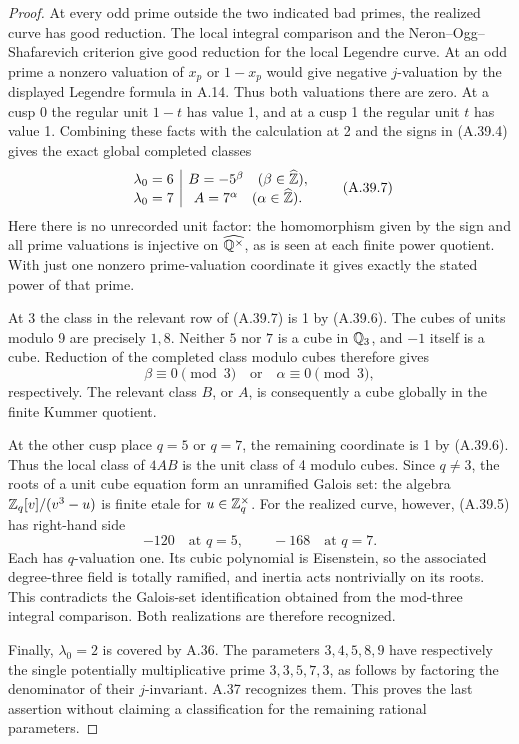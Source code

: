 \begin{proof}
At every odd prime outside the two indicated bad primes, the
realized curve has good reduction.  The local integral comparison
and the Neron--Ogg--Shafarevich criterion give good reduction for
the local Legendre curve.  At an odd prime a nonzero valuation of
$x_p$ or $1-x_p$ would give negative $j$-valuation by the displayed
Legendre formula in A.14.  Thus both valuations there are zero.
At a cusp 0 the regular unit $1-t$ has value 1, and at a cusp 1
the regular unit $t$ has value 1.  Combining these facts with the
calculation at 2 and the signs in (A.39.4) gives the exact global
completed classes
\[
 \begin{array}{c|c}
   \lambda_0=6&B=-5^\beta\quad(\beta\in\widehat{\mathbb Z}),\\
   \lambda_0=7&A=7^\alpha\quad(\alpha\in\widehat{\mathbb Z}).
 \end{array}
\tag{A.39.7}
\]
Here there is no unrecorded unit factor: the homomorphism given by
the sign and all prime valuations is injective on
$\widehat{\mathbb Q^\times}$, as is seen at each finite power quotient.
With just one nonzero prime-valuation coordinate it gives exactly
the stated power of that prime.

At $3$ the class in the relevant row of (A.39.7) is 1 by (A.39.6).
The cubes of units modulo 9 are precisely $1,8$.  Neither $5$ nor
$7$ is a cube in $\mathbb Q_3$, and $-1$ itself is a cube.  Reduction of
the completed class modulo cubes therefore gives
\[
                \beta\equiv0\pmod3\quad\text{or}\quad
                \alpha\equiv0\pmod3,
\tag{A.39.8}
\]
respectively.  The relevant class $B$, or $A$, is consequently a
cube globally in the finite Kummer quotient.

At the other cusp place $q=5$ or $q=7$, the remaining coordinate is
1 by (A.39.6).  Thus the local class of $4AB$ is the unit class of
4 modulo cubes.  Since $q\ne3$, the roots of a unit cube equation
form an unramified Galois set: the algebra
$\mathbb Z_q[v]/(v^3-u)$ is finite etale for $u\in\mathbb Z_q^\times$.
For the realized curve, however, (A.39.5) has right-hand side
\[
                 -120\quad\text{at }q=5,\qquad
                 -168\quad\text{at }q=7.
\]
Each has $q$-valuation one.  Its cubic polynomial is Eisenstein,
so the associated degree-three field is totally ramified, and
inertia acts nontrivially on its roots.  This contradicts the
Galois-set identification obtained from the mod-three integral
comparison.  Both realizations are therefore recognized.

Finally, $\lambda_0=2$ is covered by A.36.  The parameters
$3,4,5,8,9$ have respectively the single potentially multiplicative
prime $3,3,5,7,3$, as follows by factoring the denominator of their
$j$-invariant.  A.37 recognizes them.  This proves the last
assertion without claiming a classification for the remaining
rational parameters.
\end{proof}
